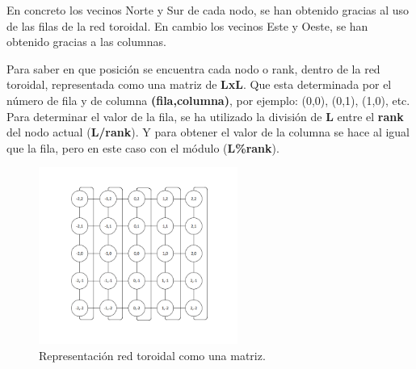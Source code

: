 \documentclass[11pt]{article}
\begin{document}
En concreto los vecinos Norte y Sur de cada nodo, se han obtenido gracias al uso de las filas de la red toroidal. En cambio los vecinos Este y Oeste, se han obtenido gracias a las columnas.

Para saber en que posición se encuentra cada nodo o rank, dentro de la red toroidal, representada como una matriz de \textbf{LxL}. Que esta determinada por el número de fila y de columna \textbf{(fila,columna)}, por ejemplo: (0,0), (0,1), (1,0), etc.
Para determinar el valor de la fila, se ha utilizado la división de \textbf{L} entre el \textbf{rank} \cite{mpi_rank} del nodo actual (\textbf{L/rank}). Y para obtener el valor de la columna se hace al igual que la fila, pero en este caso con el módulo (\textbf{L\%rank}).

\begin{figure}[H]
  \centering
    \includegraphics[width=65mm]{matriz.png}
  \caption{Representación red toroidal como una matriz.}
  \label{fig:matriz}
\end{figure}
\end{document}
